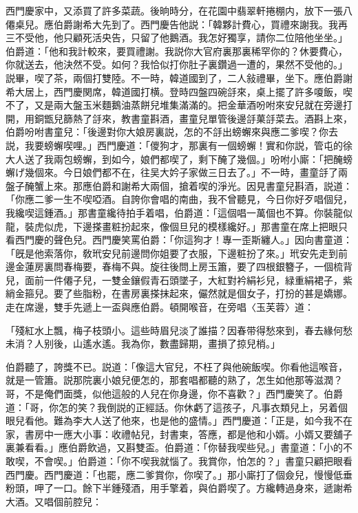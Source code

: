 西門慶家中，又添買了許多菜蔬。後晌時分，在花園中翡翠軒捲棚内，放下一張八僊桌兒。應伯爵謝希大先到了。西門慶告他説：「韓夥計費心，買禮來謝我。我再三不受他，他只顧死活央告，只留了他鵝酒。我怎好獨享，請你二位陪他坐坐。」伯爵道：「他和我計較來，要買禮謝。我説你大官府裏那裏稀罕你的？休要費心，你就送去，他決然不受。如何？我恰似打你肚子裏鑽過一遭的，果然不受他的。」説畢，喫了茶，兩個打雙陸。不一時，韓道國到了，二人敍禮畢，坐下。應伯爵謝希大居上，西門慶関席，韓道國打横。登時四盤四碗㧱來，桌上擺了許多嗄飯，喫不了，又是兩大盤玉米麵鵝油蒸餅兒堆集滿滿的。把金華酒吩咐來安兒就在旁邊打開，用銅甑兒篩熱了㧱來，教書童斟酒，畫童兒單管後邊㧱菓㧱菜去。酒斟上來，伯爵吩咐書童兒：「後邊對你大娘房裏説，怎的不㧱出螃蠏來與應二爹喫？你去説，我要螃蠏喫哩。」西門慶道：「儍狗才，那裏有一個螃蠏！實和你説，管屯的徐大人送了我兩包螃蠏，到如今，娘們都喫了，剩下醃了幾個。」吩咐小廝：「把醃螃蠏げ幾個來。今日娘們都不在，往吴大妗子家做三日去了。」不一時，畫童㧱了兩盤子醃蟹上來。那應伯爵和謝希大兩個，搶着喫的淨光。因見書童兒斟酒，説道：「你應二爹一生不喫啞酒。自誇你會唱的南曲，我不曾聽見，今日你好歹唱個兒，我纔喫這鍾酒。」那書童纔待拍手着唱，伯爵道：「這個唱一萬個也不算。你裝龍似龍，裝虎似虎，下邊搽畫粧扮起來，像個旦兒的模樣纔好。」那書童在席上把眼只看西門慶的聲色兒。西門慶笑罵伯爵：「你這狗才！專一歪斯纏人。」因向書童道：「旣是他索落你，敎玳安兒前邊問你姐要了衣服，下邊粧扮了來。」玳安先走到前邊金蓮房裏問春梅要，春梅不與。旋往後問上房玉簫，要了四根銀簪子，一個梳背兒，面前一件僊子兒，一雙金鑲假青石頭墜子，大紅對衿絹衫兒，緑重絹裙子，紫綃金箍兒。要了些脂粉，在書房裏搽抹起來，儼然就是個女子，打扮的甚是嬌娜。走在席邊，雙手先遞上一盃與應伯爵。頓開喉音，在旁唱〈玉芙蓉〉道：

「殘紅水上飄，梅子枝頭小。這些時眉兒淡了誰描？因春带得愁來到，春去緣何愁未消？人别後，山遙水遙。我為你，數盡歸期，畫損了掠兒梢。」

伯爵聽了，誇獎不已。説道：「像這大官兒，不枉了與他碗飯喫。你看他這喉音，就是一管簫。説那院裏小娘兒便怎的，那套唱都聽的熟了，怎生如他那等滋潤？哥，不是俺們面獎，似他這般的人兒在你身邊，你不喜歡？」西門慶笑了。伯爵道：「哥，你怎的笑？我倒説的正經話。你休虧了這孩子，凡事衣類兒上，另着個眼兒看他。難為李大人送了他來，也是他的盛情。」西門慶道：「正是，如今我不在家，書房中一應大小事：收禮帖兒，封書柬，答應，都是他和小婿。小婿又要舖子裏兼看看。」應伯爵飲過，又斟雙盃。伯爵道：「你替我喫些兒。」書童道：「小的不敢喫，不會喫。」伯爵道：「你不喫我就惱了。我賞你，怕怎的？」書童只顧把眼看西門慶。西門慶道：「也罷，應二爹賞你，你喫了。」那小廝打了個僉兒，慢慢低垂粉頭，呷了一口。餘下半鍾殘酒，用手擎着，與伯爵喫了。方纔轉過身來，遞謝希大酒。又唱個前腔兒：

